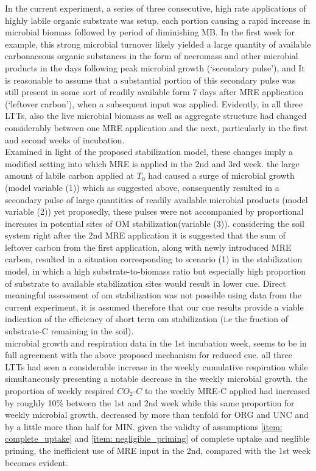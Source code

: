 	 In the current experiment, a series of three consecutive, high rate applications of highly labile organic substrate was setup, each portion causing a rapid increase in microbial biomass followed by period of diminishing MB. In the first week for example, this strong microbial turnover likely yielded a large quantity of available carbonaceous organic substances in the form of necromass and other microbial products in the days following peak microbial growth
	 (‘secondary pulse’),
 	 and It is reasonable to assume that a substantial portion of this secondary pulse was still present in some sort of readily available form 7 days after MRE application (‘leftover carbon’), when a subsequent input was applied.
 	 Evidently, in all three LTTs, also the live microbial biomass as well as  aggregate structure had changed considerably between one MRE application and the next, particularly in the first and second weeks of incubation.\\
	 Examined in light of the proposed stabilization model, these changes imply a modified setting into which MRE is applied in the 2nd and 3rd week. the large amount of labile carbon applied at $ T_0 $ had caused a surge of microbial growth (model variable (1)) which as suggested above, consequently resulted in a secondary pulse of large quantities of readily available microbial products (model variable (2)) yet proposedly, these pulses were not accompanied by proportional increases in potential sites of OM stabilization(variable (3)). considering the soil system right after the 2nd MRE application it is suggested that the sum of leftover carbon from the first application, along with newly introduced MRE carbon, resulted in a situation corresponding to scenario (1) in the stabilization model,  in which a high substrate-to-biomass ratio but especially high proportion of substrate to available stabilization sites would result in lower \gls{cue}.
	 Direct meaningful  assessment of \gls{om} stabilization was not possible using data from the current experiment,
	 it is assumed therefore that our \gls{cue} results provide a viable indication of the efficiency of short term \gls{om} stabilization (i.e the fraction of substrate-C remaining in the soil).\\
	 microbial growth and respiration data in the 1st incubation week, seems to be in full agreement with the above proposed mechanism for reduced \gls{cue}. all three LTTs had seen a considerable increase in the weekly cumulative respiration while simultaneously presenting a notable decrease in the weekly microbial growth. the proportion of weekly respired $ CO_2 $-$ C $ to the weekly MRE-C applied had increased by roughly 10\% between the 1st and 2nd week while this same proportion for weekly microbial growth, decreased by more than tenfold for ORG and UNC and by a little more than half for MIN. given the validty of assumptions \ref{item: complete_uptake} and \ref{item: negligible_priming} of complete uptake and neglible priming, the inefficient use of MRE input in the 2nd, compared with the 1st week becomes evident. \\
